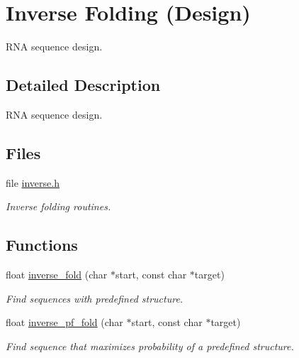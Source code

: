 \hypertarget{group__inverse__fold}{}\section{Inverse Folding (Design)}
\label{group__inverse__fold}


R\+NA sequence design.  




\subsection{Detailed Description}
R\+NA sequence design. 

\subsection*{Files}
\begin{DoxyCompactItemize}
\item 
file \mbox{\hyperlink{inverse_8h}{inverse.\+h}}
\begin{DoxyCompactList}\small\item\em Inverse folding routines. \end{DoxyCompactList}\end{DoxyCompactItemize}
\subsection*{Functions}
\begin{DoxyCompactItemize}
\item 
float \mbox{\hyperlink{group__inverse__fold_ga7af026de55d4babad879f2c92559cbbc}{inverse\+\_\+fold}} (char $\ast$start, const char $\ast$target)
\begin{DoxyCompactList}\small\item\em Find sequences with predefined structure. \end{DoxyCompactList}\item 
float \mbox{\hyperlink{group__inverse__fold_gaeef52ecbf2a2450ad585a344f9826806}{inverse\+\_\+pf\+\_\+fold}} (char $\ast$start, const char $\ast$target)
\begin{DoxyCompactList}\small\item\em Find sequence that maximizes probability of a predefined structure. \end{DoxyCompactList}\end{DoxyCompactItemize}
